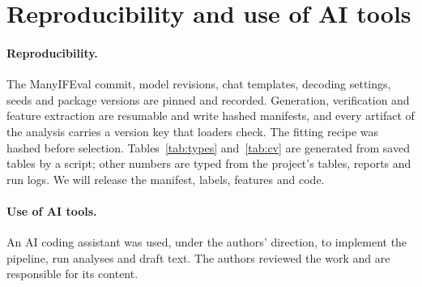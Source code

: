 \documentclass{article}
\begin{document}
\section{Reproducibility and use of AI tools}
\label{app:repro}

\paragraph{Reproducibility.} The ManyIFEval commit, model revisions, chat templates, decoding settings, seeds and
package versions are pinned and recorded. Generation, verification and feature extraction are resumable and write
hashed manifests, and every artifact of the analysis carries a version key that loaders check. The fitting recipe was
hashed before selection. Tables~\ref{tab:types} and~\ref{tab:cv} are generated from saved tables by a script; other numbers are typed from
the project's tables, reports and run logs. We will release
the manifest, labels, features and code.

\paragraph{Use of AI tools.} An AI coding assistant was used, under the authors' direction, to implement the pipeline,
run analyses and draft text. The authors reviewed the work and are responsible for its content.
\end{document}
